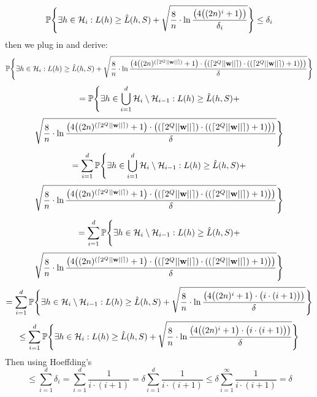 \documentclass{scrartcl}
\begin{document}
\[
    \mathbb{P} \Bigg\{
        \exists h \in {\mathcal{H}}_i : L(h) \geq \hat{L} (h, S) +
        \sqrt {
            \frac {8} {n} \cdot \ln
            \frac  { \big(
            4 \big(
            ( 2n )^i + 1
            \big)
            \big ) } {\delta_i}
        }
    \Bigg\} \leq \delta_i
\]
 then we plug in and derive:
\[
    \mathbb{P} \Bigg\{
        \exists h \in {\mathcal{H}}_i : L(h) \geq \hat{L} (h, S) +
        \sqrt {
            \frac {8} {n} \cdot \ln
            \frac { \big(
            4 \big(
                ( 2n )^{(\lceil 2^Q || {\mathbf w} ||\rceil)} + 1
            \big)
            \cdot
            \big( {(\lceil 2^Q || {\mathbf w} ||\rceil)} \cdot ({(\lceil 2^Q || {\mathbf w} ||\rceil)} + 1) \big)
            \big) } {\delta}
        }
    \Bigg\}
\]
\[ =
    \mathbb{P} \Bigg\{
        \exists h \in \bigcup^d_{i=1 }{\mathcal{H}}_i \setminus {\mathcal{H}}_{i-1} : L(h) \geq \hat{L} (h, S) + \]
\[        \sqrt {
            \frac {8} {n} \cdot \ln
            \frac { \big(
            4 \big(
                ( 2n )^{(\lceil 2^Q || {\mathbf w} ||\rceil)} + 1
            \big)
            \cdot
            \big( {(\lceil 2^Q || {\mathbf w} ||\rceil)} \cdot ({(\lceil 2^Q || {\mathbf w} ||\rceil)} + 1) \big)
            \big) } {\delta}
        }
    \Bigg\}
\]
\[ = \sum^d_{i=1}
    \mathbb{P} \Bigg\{
        \exists h \in \bigcup^d_{i=1 }{\mathcal{H}}_i \setminus {\mathcal{H}}_{i-1} : L(h) \geq \hat{L} (h, S) + \]
\[        \sqrt {
            \frac {8} {n} \cdot \ln
            \frac { \big(
            4 \big(
                ( 2n )^{(\lceil 2^Q || {\mathbf w} ||\rceil)} + 1
            \big)
            \cdot
            \big( {(\lceil 2^Q || {\mathbf w} ||\rceil)} \cdot ({(\lceil 2^Q || {\mathbf w} ||\rceil)} + 1) \big)
            \big) } {\delta}
        }
    \Bigg\}
\]
\[ = \sum^d_{i=1}
    \mathbb{P} \Bigg\{
        \exists h \in {\mathcal{H}}_i \setminus {\mathcal{H}}_{i-1} : L(h) \geq \hat{L} (h, S) + \]
\[        \sqrt {
            \frac {8} {n} \cdot \ln
            \frac { \big(
            4 \big(
                ( 2n )^{(\lceil 2^Q || {\mathbf w} ||\rceil)} + 1
            \big)
            \cdot
            \big( {(\lceil 2^Q || {\mathbf w} ||\rceil)} \cdot ({(\lceil 2^Q || {\mathbf w} ||\rceil)} + 1) \big)
            \big) } {\delta}
        }
    \Bigg\}
\]
\[ = \sum^d_{i=1}
    \mathbb{P} \Bigg\{
        \exists h \in {\mathcal{H}}_i \setminus {\mathcal{H}}_{i-1} : L(h) \geq \hat{L} (h, S) +
        \sqrt {
            \frac {8} {n} \cdot \ln
            \frac { \big(
            4 \big(
                ( 2n )^i + 1
            \big)
            \cdot
            \big( i \cdot (i + 1) \big)
            \big) } {\delta}
        }
    \Bigg\}
\]
\[ \leq \sum^d_{i=1}
    \mathbb{P} \Bigg\{
        \exists h \in {\mathcal{H}}_i : L(h) \geq \hat{L} (h, S) +
        \sqrt {
            \frac {8} {n} \cdot \ln
            \frac { \big(
            4 \big(
                ( 2n )^i + 1
            \big)
            \cdot
            \big( i \cdot (i + 1) \big)
            \big) } {\delta}
        }
    \Bigg\}
\]
Then using Hoeffding's
\[
    \leq \sum^d_{i=1} \delta_i = \sum^d_{i=1} \frac {1} {i \cdot (i + 1)} =
    \delta \sum^d_{i=1} \frac {1}
    {i \cdot (i + 1)} \leq \delta \sum^\infty_{i=1} \frac {1} {i \cdot (i + 1)} = \delta
\]
\end{document}
